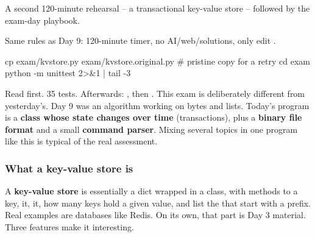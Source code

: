 \documentclass[10pt,a4paper]{article}
\begin{document}
\makecover
\setcounter{page}{2}
\makefrontmatter
\begin{goalbox}
A second 120-minute rehearsal -- a transactional key-value store -- followed by the exam-day playbook.
\end{goalbox}
\vspace{2pt}
Same rules as Day 9: 120-minute timer, no AI/web/solutions, only edit .
\begin{shcode}
cp exam/kvstore.py exam/kvstore.original.py     # pristine copy for a retry
cd exam
python -m unittest 2>&1 | tail -3
\end{shcode}
Read  first. 35 tests. Afterwards: , then .
This exam is deliberately different from yesterday’s. Day 9 was an algorithm working on bytes and lists. Today’s program is a \textbf{class whose state changes over time} (transactions), plus a \textbf{binary file format} and a small \textbf{command parser}. Mixing several topics in one program like this is typical of the real assessment.
\subsubsection{What a key-value store is}
A \textbf{key-value store} is essentially a dict wrapped in a class, with methods to  a key,  it,  it,  how many keys hold a given value, and list the  that start with a prefix. Real examples are databases like Redis. On its own, that part is Day 3 material. Three features make it interesting.
\end{document}
